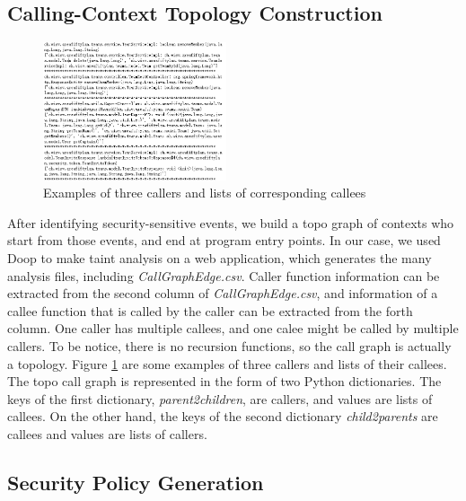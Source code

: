 \subsection{Calling-Context Topology Construction}

\begin{figure}[tbp]
  \centering
  \includegraphics[width=0.48\textwidth]{img/caller2callee.png}
  \caption{Examples of three callers and lists of corresponding callees}
  \label{caller2callee}
\end{figure}

After identifying security-sensitive events, we build a topo graph of contexts
who start from those events, and end at program entry points. In our case, we
used Doop to make taint analysis on a web application, which generates the many
analysis files, including \textit{CallGraphEdge.csv}. Caller function
information can be extracted from the second column of
\textit{CallGraphEdge.csv}, and information of a callee function that is called
by the caller can be extracted from the forth column. One caller has multiple
callees, and one calee might be called by multiple callers. To be notice, there
is no recursion functions, so the call graph is actually a topology. Figure
\ref{caller2callee} are some examples of three callers and lists of their
callees. The topo call graph is represented in the form of two Python
dictionaries. The keys of the first dictionary, \textit{parent2children}, are
callers, and values are lists of callees. On the other hand, the keys of the
second dictionary \textit{child2parents} are callees and values are lists of
callers.


\subsection{Security Policy Generation}

